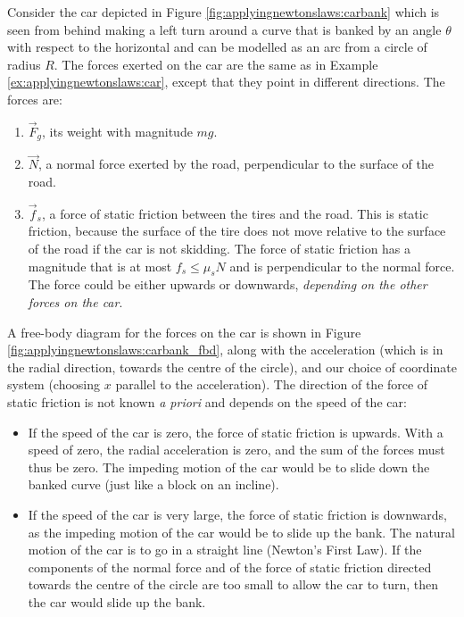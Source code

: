 Consider the car depicted in Figure \ref{fig:applyingnewtonslaws:carbank} which is seen from behind making a left turn around a curve that is banked by an angle $\theta$ with respect to the horizontal and can be modelled as an arc from a circle of radius $R$.
The forces exerted on the car are the same as in Example \ref{ex:applyingnewtonslaws:car}, except that they point in different directions. The forces are:
\begin{enumerate}
\item $\vec F_g$, its weight with magnitude $mg$.
\item $\vec N$, a normal force exerted by the road, perpendicular to the surface of the road.
\item $\vec f_s$, a force of static friction between the tires and the road. This is static friction, because the surface of the tire does not move relative to the surface of the road if the car is not skidding. The force of static friction has a magnitude that is at most $f_s\leq\mu_sN$ and is perpendicular to the normal force. The force could be either upwards or downwards, \textit{depending on the other forces on the car}.
\end{enumerate} 
A free-body diagram for the forces on the car is shown in Figure \ref{fig:applyingnewtonslaws:carbank_fbd}, along with the acceleration (which is in the radial direction, towards the centre of the circle), and our choice of coordinate system (choosing $x$ parallel to the acceleration). The direction of the force of static friction is not known \textit{a priori} and depends on the speed of the car:
\begin{itemize}
\item If the speed of the car is zero, the force of static friction is upwards. With a speed of zero, the radial acceleration is zero, and the sum of the forces must thus be zero. The impeding motion of the car would be to slide down the banked curve (just like a block on an incline).
\item If the speed of the car is very large, the force of static friction is downwards, as the impeding motion of the car would be to slide up the bank. The natural motion of the car is to go in a straight line (Newton's First Law). If the components of the normal force and of the force of static friction directed towards the centre of the circle are too small to allow the car to turn, then the car would slide up the bank.
\end{itemize}

